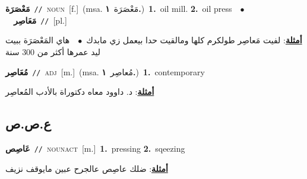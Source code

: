 \documentclass[10pt,a4paper,twoside]{article} %
\begin{document}
\begin{multicols}{2}
{\setlength\topsep{0pt}\textbf{\foreignlanguage{arabic}{مَعْصَرَة}}\ {\color{gray}\texttt{//}\color{black}}\ \textsc{noun}\ [f.]\ \color{gray}(msa. \foreignlanguage{arabic}{مَعْصَرَة}~\foreignlanguage{arabic}{\textbf{١.}})\color{black}\ \textbf{1.}~oil mill.  \textbf{2.}~oil press\ \ $\bullet$\ \ \setlength\topsep{0pt}\textbf{\foreignlanguage{arabic}{مَعَاصِر}}\ {\color{gray}\texttt{//}\color{black}}\ [pl.]\  \begin{flushright}\color{gray}\foreignlanguage{arabic}{\textbf{\underline{\foreignlanguage{arabic}{أمثلة}}}: لفيت مَعاصِر طولكرم كلها ومالقيت حدا بيعمل زي مابدك\ $\bullet$\ \  هاي المَعْصَرَة ببيت ليد عمرها أكثر من 300 سنة}\end{flushright}\color{black}} \vspace{2mm}

{\setlength\topsep{0pt}\textbf{\foreignlanguage{arabic}{مُعَاصِر}}\ {\color{gray}\texttt{//}\color{black}}\ \textsc{adj}\ [m.]\ \color{gray}(msa. \foreignlanguage{arabic}{مُعاصِر}~\foreignlanguage{arabic}{\textbf{١.}})\color{black}\ \textbf{1.}~contemporary\  \begin{flushright}\color{gray}\foreignlanguage{arabic}{\textbf{\underline{\foreignlanguage{arabic}{أمثلة}}}: د. داوود معاه دكتوراة بالأدب المُعاصِر}\end{flushright}\color{black}} \vspace{2mm}

\vspace{-3mm}
\subsection*{\color{blue}\foreignlanguage{arabic}{ع.ص.ص}\color{blue}{}} 

{\setlength\topsep{0pt}\textbf{\foreignlanguage{arabic}{عَاصِص}}\ {\color{gray}\texttt{//}\color{black}}\ \textsc{noun\textunderscore act}\ [m.]\ \textbf{1.}~pressing  \textbf{2.}~sqeezing\  \begin{flushright}\color{gray}\foreignlanguage{arabic}{\textbf{\underline{\foreignlanguage{arabic}{أمثلة}}}: ضلك عاصِص عالجرح عبين مايوقف نزيف}\end{flushright}\color{black}} \vspace{2mm}


\end{multicols}
\end{document}
